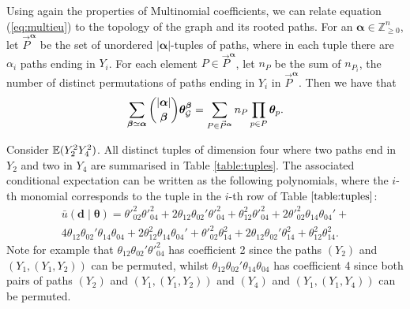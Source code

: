 Using again the properties of Multinomial coefficients, we can relate  equation (\ref{eq:multieu}) to the topology of the graph and its rooted paths. For an $\bm{\alpha}\in\mathbb{Z}^{n}_{\geq 0}$, let $\vec{P}^{\bm{\alpha}}$ be the set of unordered $|\bm{\alpha}|$-tuples of paths, where in each tuple there are $\alpha_i$ paths ending in $Y_i$. For each element $P\in\vec{P}^{\bm{\alpha}}$, let $n_P$ be the sum of $n_{P_i}$, the number of distinct permutations of  paths ending in $Y_i$ in $\vec{P}^{\bm{\alpha}}$. Then we have that
 \begin{equation*}
 \sum_{\bm{\beta}\simeq \bm{\alpha}}\binom{|\bm{\alpha}|}{\bm{\beta}}\bm{\theta}_{\mathcal{G}}^{\bm{\beta}}=\sum_{P\in\vec{P}^{\bm{\alpha}}}n_P\prod_{p\in P}\bm{\theta}_p.
 \end{equation*}
 \begin{example}
 Consider $\mathbb{E}(Y_2^2Y_4^2)$. All distinct tuples of dimension four where two paths end in $Y_2$ and two  in $Y_4$ are summarised in Table \ref{table:tuples}. The associated conditional expectation can be written as the following polynomials, where the $i$-th monomial corresponds to the tuple in the $i$-th row of Table $\ref{table:tuples}$:
 \begin{multline*}
 \bar{u}(\bm{d}\;|\;\bm{\theta})=\theta'^2_{02}\theta'^2_{04}+
 2\theta_{12}{\theta_{02}'}\theta'^2_{04}+
 \theta_{12}^2\theta'^2_{04}+
 2\theta'^2_{02}\theta_{14}\theta_{04}'+
\\ 4\theta_{12}\theta_{02}'\theta_{14}\theta_{04}+
 2\theta_{12}^2\theta_{14}\theta_{04}'+
 \theta'^2_{02}\theta_{14}^2+
 2\theta_{12}\theta_{02}'\theta_{14}^2+
 \theta_{12}^2\theta_{14}^2.
 \end{multline*}
 Note for example that $\theta_{12}{\theta_{02}'}\theta'^2_{04}$ has coefficient 2 since the paths $(Y_2)$ and $(Y_1,(Y_1,Y_2))$ can be permuted, whilst $\theta_{12}\theta_{02}'\theta_{14}\theta_{04}$ has coefficient 4 since both pairs of paths $(Y_2)$ and $(Y_1,(Y_1,Y_2))$ and $(Y_4)$ and $(Y_1,(Y_1,Y_4))$ can be permuted.
 \end{example}
 
